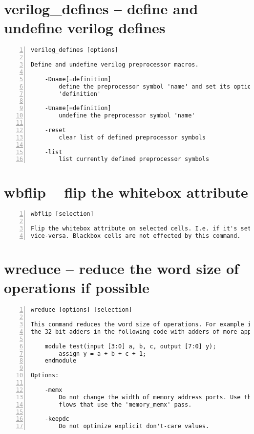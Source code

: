 \section{verilog\_defines -- define and undefine verilog defines}
\label{cmd:verilog_defines}
\begin{lstlisting}[numbers=left,frame=single]
    verilog_defines [options]

Define and undefine verilog preprocessor macros.

    -Dname[=definition]
        define the preprocessor symbol 'name' and set its optional value
        'definition'

    -Uname[=definition]
        undefine the preprocessor symbol 'name'

    -reset
        clear list of defined preprocessor symbols

    -list
        list currently defined preprocessor symbols
\end{lstlisting}

\section{wbflip -- flip the whitebox attribute}
\label{cmd:wbflip}
\begin{lstlisting}[numbers=left,frame=single]
    wbflip [selection]

Flip the whitebox attribute on selected cells. I.e. if it's set, unset it, and
vice-versa. Blackbox cells are not effected by this command.
\end{lstlisting}

\section{wreduce -- reduce the word size of operations if possible}
\label{cmd:wreduce}
\begin{lstlisting}[numbers=left,frame=single]
    wreduce [options] [selection]

This command reduces the word size of operations. For example it will replace
the 32 bit adders in the following code with adders of more appropriate widths:

    module test(input [3:0] a, b, c, output [7:0] y);
        assign y = a + b + c + 1;
    endmodule

Options:

    -memx
        Do not change the width of memory address ports. Use this options in
        flows that use the 'memory_memx' pass.

    -keepdc
        Do not optimize explicit don't-care values.
\end{lstlisting}

